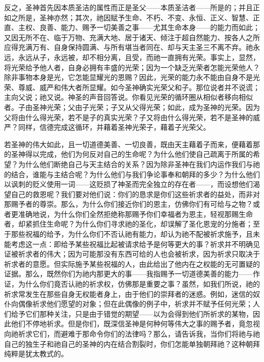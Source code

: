反之，圣神首先因本质圣洁的属性而正是圣父——本质圣洁者——所是的；并且正如之所是，圣神亦然；其次，祂因赋予生命、不朽、不变、永恒、正义、智慧、正直、主权、良善、能力、赐予一切美善之事——尤其生命本身——的能力而如此；又因无所不在、临于万物、充满大地、居于诸天、倾注于超自然能力、按各人之所应得充满万有、自身保持圆满、与所有堪当者同在、却与天主圣三不离不弃。祂永远，永远从子，永远被，却不相分离，且受，而祂一直拥有光荣。事实上，显然，将光荣给予他人者，自身必拥有丰盛的光荣；因为一个缺乏光荣者怎能光荣他人？除非事物本身是光，它怎能显耀光的恩赐？因此，光荣的能力永不能由自身不是光荣、尊威、威严和伟大者所显耀。如今圣神确实光荣父和子。那位说者并不说谎；主向父说；祂又说。神圣的声音回答说。你看见光荣的循环圈从相似者移向相似者。子由圣神光荣；父由子光荣；子又从父得光荣；如此，成为圣神的光荣。因为父将由什么得光荣，若不是子的真实光荣？子又将由什么得光荣，若不是圣神的威严？同样，信德完成这循环，并藉着圣神光荣子，藉着子光荣父。\par

若圣神的伟大如此，且一切道德美善、一切良善，既由天主藉着子而来，便藉着那的圣神得以完成，他们为何反对自己的生命呢？为什么他们使自己疏离于所属的希望？为什么他们断绝自己与天主结合的关系？因为除非圣神在我们内运作我们与祂的结合，谁能与主结合呢？为什么他们与我们争论事奉和朝拜的多少？为什么他们以讽刺的贬义使用一词——这贬损了神圣而完全独立的存在者——，而设想他们渴望自己的救恩呢？我们要对他们说：你们的恳求是你们这些祈求者的益处，而非对那赐予者的尊崇。那么，为什么你们接近你们的恩主，仿佛你们有可给与之物？或者更准确地说，为什么你们全然拒绝称那赐予你们幸福者为恩主，轻视那赐生命者，却紧抓住生命呢？为什么你们寻求祂的圣化，却误解了圣化恩宠的分施者；至于那些祝福的给予，为什么你们不否认祂有能力，却认为祂不配被祈求施予，且未能考虑这一点：即给予某些祝福比起被请求给予是何等更大的事？祈求并不明确见证被祈求者的伟大；因为可能那没有东西可给的人也会被祈求，因为祈求只取决于祈求者的意愿。但实际施予某些祝福的人，由此给出了他内在之权能的无可置疑的证据。那么，既然你们为祂内那更大的事——我指赐予一切道德美善的能力——作证，为什么你们竟否认祂的祈求权，仿佛那是重要之事？虽然，如我们所说，祂的祈求常发生在那些自身无权能者身上，由于他们的崇拜者的迷惑。例如，迷信的奴仆向偶像祈求他们愿望的对象；但在此偶像的例子中，祈求并不赋予任何光荣；人们给予它们那种关注，只是由于错觉的期望——以为会得到他们所祈求的某物，因此他们不停地祈求。但是你们，既深信圣神是何种何等伟大之事的赐予者，竟忽视向祂祈求它们，而避难于那命令你们的法律吗？那么，请告诉我，当你们将祂与祂自己的独生子和祂自己的圣神的内在结合割裂时，你们怎能单独朝拜祂？这种朝拜纯粹是犹太教式的。\par

